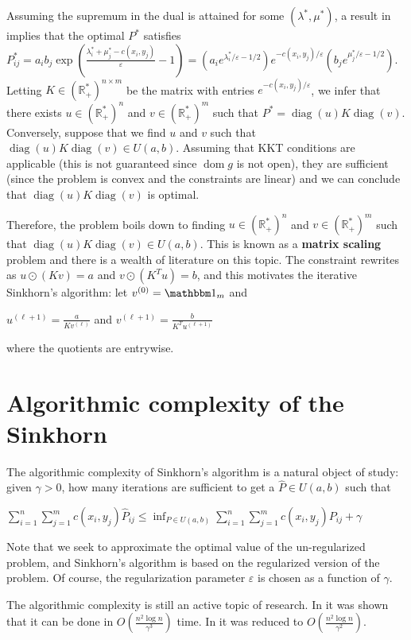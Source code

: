 \documentclass[12pt]{report}
\theoremstyle{definition}
\theoremstyle{remark}
\DeclareMathOperator{\dom}{dom}
\DeclareMathOperator*{\diag}{diag}
\begin{document}
Assuming the supremum in the dual is attained for some $(\lambda^*,\mu^*)$, a result in \\ \cite[Section~5.5.2]{boyd2004convex} implies that the optimal $P^*$ satisfies\\ $P_{ij}^* =a_i b_j \exp\left(\frac{\lambda_i^*+\mu_j^*-c(x_i,y_j)}{\varepsilon}-1 \right) = (a_ie^{\lambda_i^*/\varepsilon-1/2})e^{-c(x_i,y_j)/\varepsilon}(b_je^{\mu_j^*/\varepsilon-1/2})$. Letting $K\in (\mathbb R_+^*)^{n\times m}$ be the matrix with entries $e^{-c(x_i,y_j)/\varepsilon}$, we infer that there exists $u\in (\mathbb R_+^*)^n$ and $v\in  (\mathbb R_+^*)^m$ such that $P^* = \diag(u)K\diag(v)$. Conversely, suppose that we find $u$ and $v$ such that $\diag(u)K\diag(v)\in U(a,b)$. Assuming that KKT conditions are applicable (this is not guaranteed since $\dom g$ is not open), they are sufficient (since the problem is convex and the constraints are linear) and we can conclude that $\diag(u)K\diag(v)$ is optimal.
\par Therefore, the problem boils down to finding $u\in (\mathbb R_+^*)^n$ and $v\in  (\mathbb R_+^*)^m$ such that $\diag(u)K\diag(v)\in U(a,b)$. This is known as a \textbf{matrix scaling} problem and there is a wealth of literature on this topic. The constraint rewrites as $u \odot (Kv) = a$ and $v \odot (K^Tu) =b$, and this motivates the iterative Sinkhorn's algorithm: let $v^{(0)}=\mathbbm 1_m$ and \begin{center}
	$\displaystyle u^{(\ell+1)} = \frac{a}{K v^{(\ell)}}$ and $\displaystyle v^{(\ell+1)} = \frac{b}{K^T u^{(\ell+1)}}$
\end{center} where the quotients are entrywise.

\section{Algorithmic complexity of the Sinkhorn}

\hspace{\parindent} The algorithmic complexity of Sinkhorn's algorithm is a natural object of study: given $\gamma>0$, how many iterations are sufficient to get a $\hat P\in U(a,b)$ such that \begin{center}
	$\displaystyle \sum_{i=1}^n\sum_{j=1}^m c(x_i,y_j)\hat P_{ij} \leq \inf_{P\in U(a,b)} \sum_{i=1}^n\sum_{j=1}^m c(x_i,y_j)P_{ij} + \gamma$
\end{center}
Note that we seek to approximate the optimal value of the un-regularized problem, and Sinkhorn's algorithm is based on the regularized version of the problem. Of course, the regularization parameter $\varepsilon$ is chosen as a function of $\gamma$.\\
\par The algorithmic complexity is still an active topic of research. In \cite{altschuler2017near} it was shown that it can be done in $O\left(\frac{n^2\log n}{\gamma^3} \right)$ time. In \cite{dvurechensky2018computational} it was reduced to $O\left(\frac{n^2\log n}{\gamma^2} \right)$.
\end{document}
